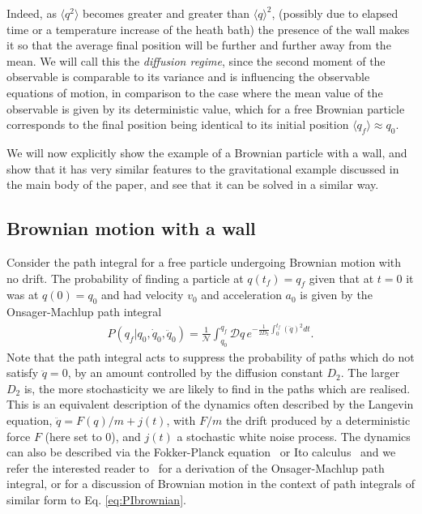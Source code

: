 \documentclass[aps,pra,amsmath,amssymb,amsthm,floatfix,nofootinbib,notitlepage,superscriptaddress,10pt]{revtex4-2}
\begin{document}
Indeed, as $\langle q^2\rangle$ becomes greater and greater than $\langle q\rangle^2$, (possibly due to elapsed time or a temperature increase of the heath bath) the presence of the wall makes it so that the average final position will be further and further away from the mean. We will call this the \textit{diffusion regime}, since the second moment of the observable is comparable to its variance and is influencing the observable equations of motion, in comparison to the case where the mean value of the observable is given by its deterministic value, which for a free Brownian particle corresponds to the final position being identical to its initial position $\langle q_f\rangle\approx q_0$.


We will now explicitly show the example of a Brownian particle with a wall, and show that it has very similar features to the gravitational example discussed in the main body of the paper, and see that it can be solved in a similar way.

\subsection*{Brownian motion with a wall}

Consider the path integral for a free particle undergoing Brownian motion with no drift. The probability of finding a particle at $q(t_f)=q_f$ given that at $t=0$ it was at $q(0)=q_0$ and had velocity $v_0$ and acceleration $a_0$ is given by the Onsager-Machlup path integral
\begin{align}
	P(q_f|q_0,\dot{q}_0,\ddot{q}_0)=\frac{1}{\mathcal{N}}\int_{q_0}^{q_f} \mathcal{D}q\, e^{-\frac{1}{2 D_2}\int_{0}^{t_f} (\ddot{q})^2 dt}.
	\label{eq:PIbrownian}
\end{align}
Note that the path integral acts to suppress the probability of paths which do not satisfy $\ddot{q}=0$, by an amount controlled by the diffusion constant $D_2$. The larger $D_2$ is, the more stochasticity we are likely to find in the paths which are realised.
This is an equivalent description of the dynamics often described by the Langevin equation, $\ddot{q}=F(q)/m+j(t)$, with $F/m$ the drift produced by a deterministic force $F$ (here set to $0$), and $j(t)$ a stochastic white noise process. The dynamics can also be described via the Fokker-Planck equation~\cite{risken1996fokker}  or Ito calculus~\cite{gardiner2004handbook} and we refer the interested reader to~\cite{risken1996fokker} for a derivation of the Onsager-Machlup path integral, or \cite{feynman1965quantum} for a discussion of Brownian motion in the context of path integrals of similar form to Eq. \eqref{eq:PIbrownian}.
\end{document}
